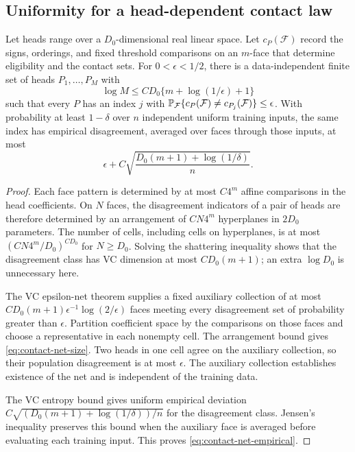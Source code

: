 \subsection{Uniformity for a head-dependent contact law}
\begin{lemma}\label{lem:contact-pattern-net}
Let heads range over a $D_0$-dimensional real linear space.
Let $c_P(\mathcal F)$ record the signs, orderings, and fixed threshold
comparisons on an $m$-face that determine eligibility and the contact
sets. For $0<\epsilon<1/2$, there is a data-independent finite set of
heads $P_1,\ldots,P_M$ with
\begin{equation}\label{eq:contact-net-size}
 \log M\le C D_0\{m+\log(1/\epsilon)+1\}
\end{equation}
such that every $P$ has an index $j$ with
$\mathbb P_{\mathcal F}\{c_P(\mathcal F)\ne c_{P_j}(\mathcal F)\}\le\epsilon$.
With probability at least $1-\delta$ over $n$ independent uniform
training inputs, the same index has empirical disagreement, averaged
over faces through those inputs, at most
\begin{equation}\label{eq:contact-net-empirical}
 \epsilon+C\sqrt{\frac{D_0(m+1)+\log(1/\delta)}n}.
\end{equation}
\end{lemma}
\begin{proof}
Each face pattern is determined by at most $C4^m$ affine comparisons
in the head coefficients. On $N$ faces, the disagreement indicators
of a pair of heads are therefore determined by an arrangement of
$CN4^m$ hyperplanes in $2D_0$ parameters. The number of cells,
including cells on hyperplanes, is at most
$(CN4^m/D_0)^{CD_0}$ for $N\ge D_0$. Solving the shattering
inequality shows that the disagreement class has VC dimension at most
$CD_0(m+1)$; an extra $\log D_0$ is unnecessary here.

The VC epsilon-net theorem supplies a fixed auxiliary collection of
at most $C D_0(m+1)\epsilon^{-1}\log(2/\epsilon)$ faces meeting every
disagreement set of probability greater than $\epsilon$. Partition
coefficient space by the comparisons on those faces and choose a
representative in each nonempty cell. The arrangement bound gives
\eqref{eq:contact-net-size}. Two heads in one cell agree on the
auxiliary collection, so their population disagreement is at most
$\epsilon$. The auxiliary collection establishes existence of the net
and is independent of the training data.

The VC entropy bound gives uniform empirical deviation
$C\sqrt{(D_0(m+1)+\log(1/\delta))/n}$ for the disagreement class.
Jensen's inequality preserves this bound when the auxiliary face is
averaged before evaluating each training input. This proves
\eqref{eq:contact-net-empirical}.
\end{proof}

